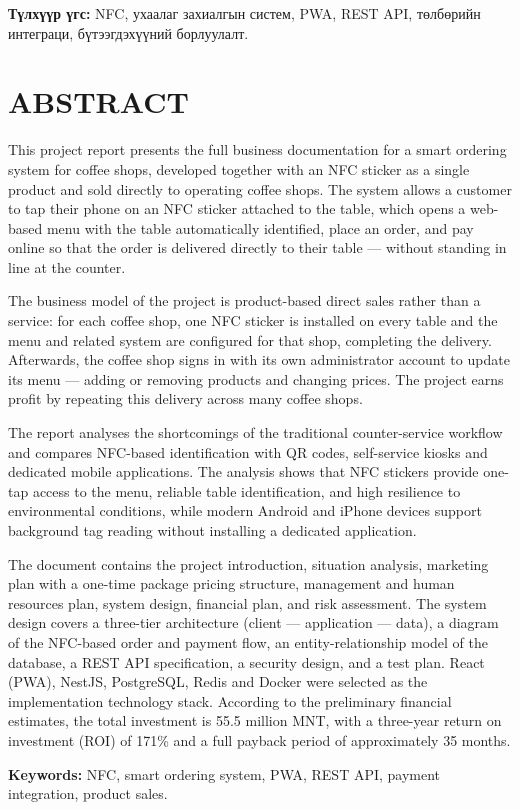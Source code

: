 \noindent\textbf{Түлхүүр үгс:} NFC, ухаалаг захиалгын систем, PWA,
REST API, төлбөрийн интеграци, бүтээгдэхүүний борлуулалт.

\chapter*{ABSTRACT}

This project report presents the full business documentation for a
smart ordering system for coffee shops, developed together with an
NFC sticker as a single product and sold directly to operating coffee
shops. The system allows a customer to tap their phone on an NFC
sticker attached to the table, which opens a web-based menu with the
table automatically identified, place an order, and pay online so
that the order is delivered directly to their table --- without
standing in line at the counter.

The business model of the project is product-based direct sales
rather than a service: for each coffee shop, one NFC sticker is
installed on every table and the menu and related system are
configured for that shop, completing the delivery. Afterwards, the
coffee shop signs in with its own administrator account to update
its menu --- adding or removing products and changing prices. The
project earns profit by repeating this delivery across many coffee
shops.

The report analyses the shortcomings of the traditional counter-service
workflow and compares NFC-based identification with QR codes,
self-service kiosks and dedicated mobile applications. The analysis shows
that NFC stickers provide one-tap access to the menu, reliable table
identification, and high resilience to environmental conditions, while
modern Android and iPhone devices support background tag reading without
installing a dedicated application.

The document contains the project introduction, situation analysis,
marketing plan with a one-time package pricing structure, management
and human resources plan, system design, financial plan, and risk
assessment. The system design covers a three-tier architecture
(client --- application --- data), a diagram of the NFC-based order
and payment flow, an entity-relationship model of the database, a REST
API specification, a security design, and a test plan. React (PWA),
NestJS, PostgreSQL, Redis and Docker were selected as the
implementation technology stack. According to the preliminary financial
estimates, the total investment is 55.5 million MNT, with a three-year
return on investment (ROI) of 171\% and a full payback period of
approximately 35 months.

\noindent\textbf{Keywords:} NFC, smart ordering system, PWA, REST API,
payment integration, product sales.
